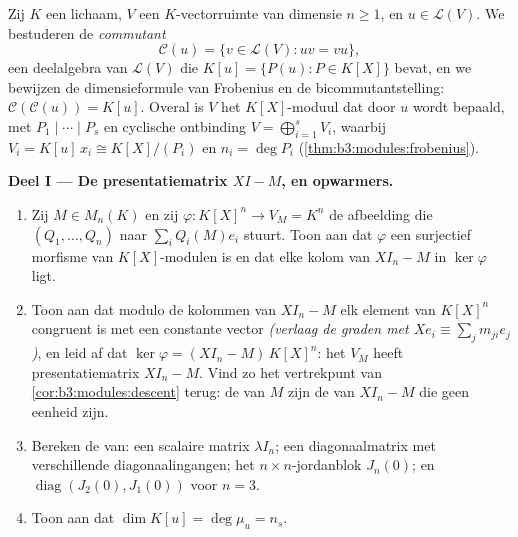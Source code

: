 \begin{problem}\label{pb:b3:modules:1}
Zij $K$ een lichaam, $V$ een $K$-vectorruimte van dimensie $n \geq
1$, en $u \in \mathcal L(V)$. We bestuderen de \emph{commutant}
\[
\mathcal C(u) = \{v \in \mathcal L(V) : uv = vu\},
\]
een deelalgebra van $\mathcal L(V)$ die $K[u] = \{P(u) : P \in
K[X]\}$ bevat, en we bewijzen de dimensieformule van Frobenius en
de bicommutantstelling: $\mathcal C(\mathcal C(u)) = K[u]$. Overal
is $V$ het $K[X]$-moduul dat door $u$ wordt bepaald, met
 $P_1 \mid \cdots \mid P_s$ en
cyclische ontbinding $V = \bigoplus_{i=1}^s V_i$, waarbij $V_i =
K[u]\,x_i \cong K[X]/(P_i)$ en $n_i = \deg P_i$
(\cref{thm:b3:modules:frobenius}).

\medskip
\noindent\textbf{Deel I --- De presentatiematrix $XI - M$, en
opwarmers.}
\begin{enumerate}
  \item Zij $M \in M_n(K)$ en zij $\varphi \colon K[X]^n \to V_M =
        K^n$ de afbeelding die $(Q_1, \dots, Q_n)$ naar $\sum_i
        Q_i(M)e_i$ stuurt. Toon aan dat $\varphi$ een surjectief
        morfisme van $K[X]$-modulen is en dat elke kolom van $XI_n
        - M$ in $\ker\varphi$ ligt.
  \item Toon aan dat modulo de kolommen van $XI_n - M$ elk element
        van $K[X]^n$ congruent is met een constante vector
        \emph{(verlaag de graden met $Xe_i \equiv \sum_j
        m_{ji}e_j$)}, en leid af dat $\ker\varphi = (XI_n -
        M)\,K[X]^n$: het  $V_M$ heeft presentatiematrix $XI_n
        - M$. Vind zo het vertrekpunt van
        \cref{cor:b3:modules:descent} terug: de
         van $M$ zijn de  van $XI_n - M$ die geen eenheid zijn.
  \item Bereken de  van: een
        scalaire matrix $\lambda I_n$; een diagonaalmatrix met
        verschillende diagonaalingangen; het $n \times
        n$-jordanblok $J_n(0)$; en
        $\operatorname{diag}(J_2(0), J_1(0))$ voor $n = 3$.
  \item Toon aan dat $\dim K[u] = \deg \mu_u = n_s$.
\end{enumerate}


\end{problem}
